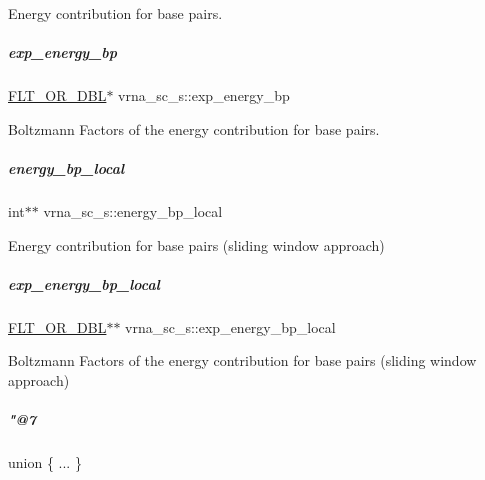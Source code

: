 Energy contribution for base pairs. 

\mbox{\label{group__soft__constraints_a62c22be478cd630541c91f73e6cb0d75}} 
\subparagraph{\texorpdfstring{exp\+\_\+energy\+\_\+bp}{exp\_energy\_bp}}
{\footnotesize\ttfamily \mbox{\hyperlink{group__data__structures_ga31125aeace516926bf7f251f759b6126}{F\+L\+T\+\_\+\+O\+R\+\_\+\+D\+BL}}$\ast$ vrna\+\_\+sc\+\_\+s\+::exp\+\_\+energy\+\_\+bp}



Boltzmann Factors of the energy contribution for base pairs. 

\mbox{\label{group__soft__constraints_ad939d2511afe7b3db9b802fdeff2bac4}} 
\subparagraph{\texorpdfstring{energy\+\_\+bp\+\_\+local}{energy\_bp\_local}}
{\footnotesize\ttfamily int$\ast$$\ast$ vrna\+\_\+sc\+\_\+s\+::energy\+\_\+bp\+\_\+local}



Energy contribution for base pairs (sliding window approach) 

\mbox{\label{group__soft__constraints_a6d882019efc1e09d385ef751765b3a80}} 
\subparagraph{\texorpdfstring{exp\+\_\+energy\+\_\+bp\+\_\+local}{exp\_energy\_bp\_local}}
{\footnotesize\ttfamily \mbox{\hyperlink{group__data__structures_ga31125aeace516926bf7f251f759b6126}{F\+L\+T\+\_\+\+O\+R\+\_\+\+D\+BL}}$\ast$$\ast$ vrna\+\_\+sc\+\_\+s\+::exp\+\_\+energy\+\_\+bp\+\_\+local}



Boltzmann Factors of the energy contribution for base pairs (sliding window approach) 

\mbox{\label{group__soft__constraints_a49576d21f334eceaee2eab242f694ca2}} 
\subparagraph{\texorpdfstring{"@7}{@7}}
{\footnotesize\ttfamily union \{ ... \} }

